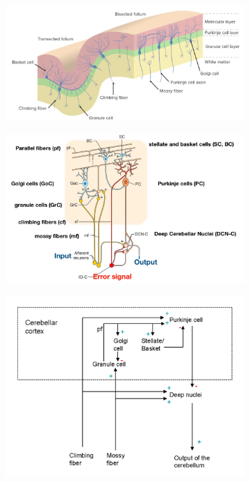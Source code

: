 \documentclass[11pt]{book} %
\begin{document}
\begin{figure}[ht]
    \centering
    \begin{subfigure}[b]{0.5\textwidth}
        \centering
        \includegraphics[width=\textwidth]{./Figs/cerebellums_anatomy.jpg}
        \label{fig:first_subfig}
    \end{subfigure}
    \hfill
    \begin{subfigure}[b]{0.5\textwidth}
        \centering
        \includegraphics[width=\textwidth]{./Figs/cerebellums_anatomy2.jpeg}
        \label{fig:second_subfig}
    \end{subfigure}
    \hfill
    \begin{subfigure}[b]{0.5\textwidth}
        \centering
        \includegraphics[width=\textwidth]{./Figs/cerebellums_anatomy3.jpeg}

\end{subfigure}
\end{figure}
\end{document}
